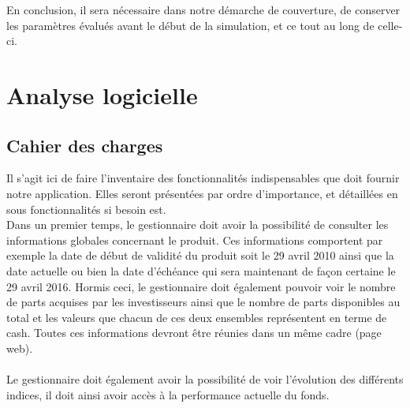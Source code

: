 \documentclass[french,12pt,a4paper]{article}
\begin{document}
En conclusion, il sera nécessaire dans notre démarche de couverture, de conserver les paramètres évalués avant le début de la simulation, et ce tout au long de celle-ci.
  



\section{Analyse logicielle}

\subsection{Cahier des charges}
Il s'agit ici de faire l'inventaire des fonctionnalités indispensables que doit fournir notre application. Elles seront présentées par ordre d'importance, et détaillées en sous fonctionnalités si besoin est.
\\
\indent Dans un premier temps, le gestionnaire doit avoir la possibilité de consulter les informations globales concernant le produit. Ces informations comportent par exemple la date de début de validité du produit soit le 29 avril  2010 ainsi que la date actuelle ou bien la date d'échéance qui sera maintenant de façon certaine le 29 avril 2016. Hormis ceci, le gestionnaire doit également pouvoir voir le nombre de parts acquises par les investisseurs ainsi que le nombre de parts disponibles au total et les valeurs que chacun de ces deux ensembles représentent en terme de cash. Toutes ces informations devront être réunies dans un même cadre (page web).\\
\indent \\
\indent Le gestionnaire doit également avoir la possibilité de voir l'évolution des différents indices, il doit ainsi avoir accès à la performance actuelle du fonds.
\end{document}

